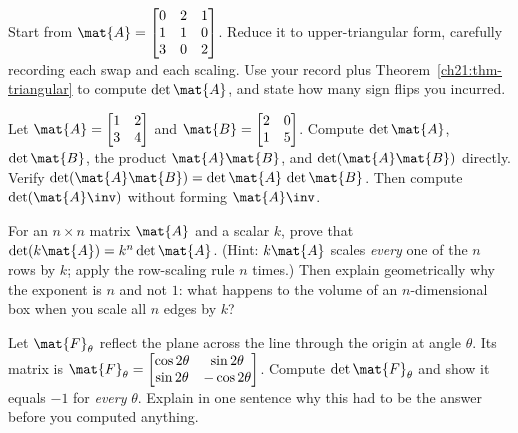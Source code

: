 \begin{exercise}
\label{ch21:ex-rowops}
Start from $\mat{A} = \begin{bmatrix} 0 & 2 & 1 \\ 1 & 1 & 0 \\ 3 & 0 & 2 \end{bmatrix}$.
Reduce it to upper-triangular form, carefully recording each swap and each scaling.
Use your record plus Theorem~\ref{ch21:thm-triangular} to compute $\det\mat{A}$, and
state how many sign flips you incurred.
\end{exercise}

\begin{exercise}
\label{ch21:ex-product-hand}
Let $\mat{A} = \begin{bmatrix} 1 & 2 \\ 3 & 4 \end{bmatrix}$ and
$\mat{B} = \begin{bmatrix} 2 & 0 \\ 1 & 5 \end{bmatrix}$. Compute $\det\mat{A}$,
$\det\mat{B}$, the product $\mat{A}\mat{B}$, and $\det(\mat{A}\mat{B})$ directly.
Verify $\det(\mat{A}\mat{B}) = \det\mat{A}\,\det\mat{B}$. Then compute
$\det(\mat{A}\inv)$ without forming $\mat{A}\inv$.
\end{exercise}

\begin{exercise}
\label{ch21:ex-scaling}
For an $n\times n$ matrix $\mat{A}$ and a scalar $k$, prove that
$\det(k\mat{A}) = k^n\det\mat{A}$. (Hint: $k\mat{A}$ scales \emph{every} one of the
$n$ rows by $k$; apply the row-scaling rule $n$ times.) Then explain geometrically
why the exponent is $n$ and not $1$: what happens to the volume of an
$n$-dimensional box when you scale all $n$ edges by $k$?
\end{exercise}

\begin{exercise}
\label{ch21:ex-reflection-line}
Let $\mat{F}_\theta$ reflect the plane across the line through the origin at angle
$\theta$. Its matrix is
$\mat{F}_\theta = \begin{bmatrix} \cos 2\theta & \sin 2\theta \\ \sin 2\theta & -\cos 2\theta \end{bmatrix}$.
Compute $\det\mat{F}_\theta$ and show it equals $-1$ for \emph{every} $\theta$.
Explain in one sentence why this had to be the answer before you computed
anything.
\end{exercise}

